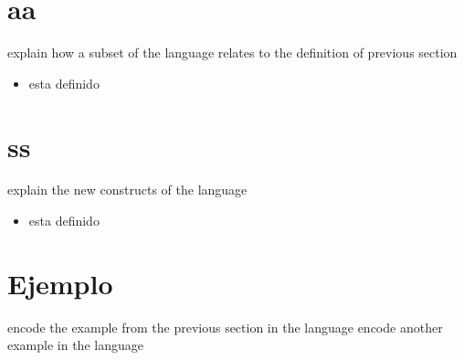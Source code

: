 \section{aa}
\label{aa.lang}

explain how a subset of the language relates to the \SCCP definition of previous section

\begin{itemize}
\item {} esta definido
\end{itemize}


\section{ss}
\label{ss.lang}

explain the new constructs of the language

\begin{itemize}
\item {} esta definido
\end{itemize}


\section{Ejemplo}
\label{example.lang}

encode the example from the previous section in the language
encode another example in the language
